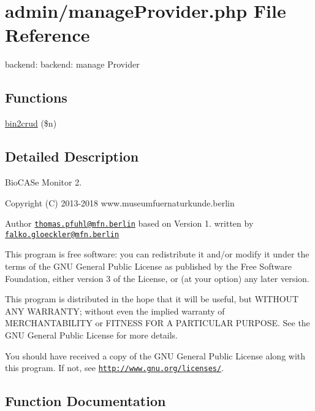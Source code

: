 \hypertarget{manage_provider_8php}{}\section{admin/manage\+Provider.php File Reference}
\label{manage_provider_8php}


backend\+: backend\+: manage Provider  


\subsection*{Functions}
\begin{DoxyCompactItemize}
\item 
\hyperlink{manage_provider_8php_ac4a74e72e3c7731da127516dd1265aae}{bin2crud} (\$n)
\end{DoxyCompactItemize}


\subsection{Detailed Description}
Bio\+C\+A\+Se Monitor 2. \begin{DoxyCopyright}{Copyright}
(C) 2013-\/2018 www.\+museumfuernaturkunde.\+berlin 
\end{DoxyCopyright}
\begin{DoxyAuthor}{Author}
\href{mailto:thomas.pfuhl@mfn.berlin}{\tt thomas.\+pfuhl@mfn.\+berlin} based on Version 1. written by \href{mailto:falko.gloeckler@mfn.berlin}{\tt falko.\+gloeckler@mfn.\+berlin}
\end{DoxyAuthor}
This program is free software\+: you can redistribute it and/or modify it under the terms of the G\+NU General Public License as published by the Free Software Foundation, either version 3 of the License, or (at your option) any later version.

This program is distributed in the hope that it will be useful, but W\+I\+T\+H\+O\+UT A\+NY W\+A\+R\+R\+A\+N\+TY; without even the implied warranty of M\+E\+R\+C\+H\+A\+N\+T\+A\+B\+I\+L\+I\+TY or F\+I\+T\+N\+E\+SS F\+OR A P\+A\+R\+T\+I\+C\+U\+L\+AR P\+U\+R\+P\+O\+SE. See the G\+NU General Public License for more details.

You should have received a copy of the G\+NU General Public License along with this program. If not, see \href{http://www.gnu.org/licenses/}{\tt http\+://www.\+gnu.\+org/licenses/}. 

\subsection{Function Documentation}
